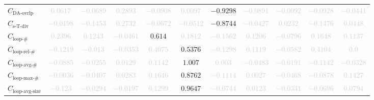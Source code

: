 \documentclass{standalone}
\newcommand{\daoverlapname}{\text{DA-ovrlp}}
\newcommand{\daoverlap}{C_{\daoverlapname}}
\newcommand{\simpletracedivname}{\text{s-T-div}}
\newcommand{\simpletracediv}{C_{\simpletracedivname}}
\newcommand{\loopnumname}{\text{loop-\#}}
\newcommand{\loopnum}{C_{\loopnumname}}
\newcommand{\looprelnumname}{\text{loop-rel-\#}}
\newcommand{\looprelnum}{C_{\looprelnumname}}
\newcommand{\loopavgname}{\text{loop-avg-\#}}
\newcommand{\loopavg}{C_{\loopavgname}}
\newcommand{\loopmaxname}{\text{loop-max-\#}}
\newcommand{\loopmax}{C_{\loopmaxname}}
\newcommand{\loopavgsizename}{\text{loop-avg-size}}
\newcommand{\loopavgsize}{C_{\loopavgsizename}}
\begin{document}
\begin{tabular}{lcccccccccc}
$\daoverlap$ & \textcolor{lightgray}{$0.0617$} & \textcolor{lightgray}{$-0.0689$} & \textcolor{lightgray}{$0.2893$} & \textcolor{lightgray}{$-0.0908$} & \textcolor{lightgray}{$0.0097$} & $-0.9298$ & \textcolor{lightgray}{$-0.0891$} & \textcolor{lightgray}{$-0.0092$} & \textcolor{lightgray}{$-0.0928$} & \textcolor{lightgray}{$-0.0441$} \\ 
$\simpletracediv$ & \textcolor{lightgray}{$-0.0198$} & \textcolor{lightgray}{$-0.1453$} & \textcolor{lightgray}{$0.2732$} & \textcolor{lightgray}{$-0.0672$} & \textcolor{lightgray}{$-0.0512$} & $-0.8744$ & \textcolor{lightgray}{$-0.0427$} & \textcolor{lightgray}{$0.0232$} & \textcolor{lightgray}{$-0.1476$} & \textcolor{lightgray}{$0.0448$} \\ 
$\loopnum$ & \textcolor{lightgray}{$0.2396$} & \textcolor{lightgray}{$0.1243$} & \textcolor{lightgray}{$-0.0461$} & $0.614$ & \textcolor{lightgray}{$0.1812$} & \textcolor{lightgray}{$-0.1562$} & \textcolor{lightgray}{$0.1206$} & \textcolor{lightgray}{$-0.0796$} & \textcolor{lightgray}{$0.1648$} & \textcolor{lightgray}{$0.1137$} \\ 
$\looprelnum$ & \textcolor{lightgray}{$-0.1219$} & \textcolor{lightgray}{$-0.013$} & \textcolor{lightgray}{$-0.0353$} & \textcolor{lightgray}{$0.4075$} & $0.5376$ & \textcolor{lightgray}{$-0.1298$} & \textcolor{lightgray}{$0.1119$} & \textcolor{lightgray}{$-0.0582$} & \textcolor{lightgray}{$0.4104$} & \textcolor{lightgray}{$0.0$} \\ 
$\loopavg$ & \textcolor{lightgray}{$-0.0885$} & \textcolor{lightgray}{$-0.0255$} & \textcolor{lightgray}{$0.0129$} & \textcolor{lightgray}{$0.1142$} & $1.007$ & \textcolor{lightgray}{$0.003$} & \textcolor{lightgray}{$-0.0483$} & \textcolor{lightgray}{$-0.0191$} & \textcolor{lightgray}{$-0.1142$} & \textcolor{lightgray}{$-0.0328$} \\ 
$\loopmax$ & \textcolor{lightgray}{$-0.0036$} & \textcolor{lightgray}{$-0.0407$} & \textcolor{lightgray}{$0.0283$} & \textcolor{lightgray}{$0.1646$} & $0.8762$ & \textcolor{lightgray}{$-0.1114$} & \textcolor{lightgray}{$0.0027$} & \textcolor{lightgray}{$-0.0468$} & \textcolor{lightgray}{$-0.0878$} & \textcolor{lightgray}{$0.1427$} \\ 
$\loopavgsize$ & \textcolor{lightgray}{$-0.123$} & \textcolor{lightgray}{$-0.0294$} & \textcolor{lightgray}{$-0.0197$} & \textcolor{lightgray}{$0.1299$} & $0.9647$ & \textcolor{lightgray}{$-0.0744$} & \textcolor{lightgray}{$0.0123$} & \textcolor{lightgray}{$-0.0331$} & \textcolor{lightgray}{$-0.0696$} & \textcolor{lightgray}{$0.0794$} \\ 

\end{tabular}
\end{document}
